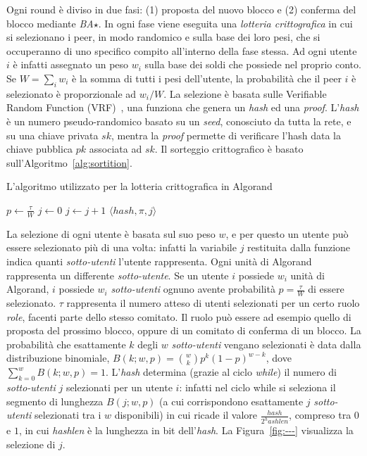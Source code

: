 Ogni round è diviso in due fasi: (1) proposta del nuovo blocco e (2) conferma del blocco mediante \emph{BA$\star$}.
In ogni fase viene eseguita una \emph{lotteria crittografica} in cui si selezionano i peer, in modo randomico e sulla base dei loro pesi, che si occuperanno di uno specifico compito all'interno della fase stessa. Ad ogni utente $i$ è infatti assegnato un peso $w_i$ sulla base dei soldi che possiede nel proprio conto. Se $W = \sum_i w_i$ è la somma di tutti i pesi dell'utente, la probabilità che il peer $i$ è selezionato è proporzionale ad $w_i/W$. La selezione è basata sulle Verifiable Random Function (VRF)~\cite{micali1999verifiable}, una funziona che genera un \emph{hash} ed una \emph{proof}. L'\emph{hash} è un numero pseudo-randomico basato su un \emph{seed}, conosciuto da tutta la rete, e su una chiave privata $sk$, mentra la \emph{proof} permette di verificare l'hash data la chiave pubblica $pk$ associata ad $sk$.
Il sorteggio crittografico è basato sull'Algoritmo~\ref{alg:sortition}.
\begin{algorithm}
	\caption{L'algoritmo utilizzato per la lotteria crittografica in Algorand}
	\begin{algorithmic}
			\State $p \leftarrow \frac{\tau}{W}$
			\State $j \leftarrow 0$
			\While{$\frac{hash}{2^{hashlen}} \notin [ \sum_{k = 0}^j B(k; w, p), \sum_{k=0}^{j+1} B(k; w, p) )$}
			\State $j \leftarrow j + 1$
			\EndWhile
			\Return $\langle hash, \pi, j \rangle$
		\EndProcedure
	\end{algorithmic}
	\label{alg:sortition}
\end{algorithm}
La selezione di ogni utente è basata sul suo peso $w$, e per questo un utente può essere selezionato più di una volta: infatti la variabile $j$ restituita dalla funzione indica quanti \emph{sotto-utenti} l'utente rappresenta. Ogni unità di Algorand rappresenta un differente \emph{sotto-utente}. Se un utente $i$ possiede $w_i$ unità di Algorand, $i$ possiede $w_i$ \emph{sotto-utenti} ognuno avente probabilità $p = \frac{\tau}{W}$ di essere selezionato. $\tau$ rappresenta il numero atteso di utenti selezionati per un certo ruolo \emph{role}, facenti parte dello stesso comitato. Il ruolo può essere ad esempio quello di proposta del prossimo blocco, oppure di un comitato di conferma di un blocco. La probabilità che esattamente $k$ degli $w$ \emph{sotto-utenti} vengano selezionati è data dalla distribuzione binomiale, $B(k; w, p) = \binom{w}{k} p^k (1-p)^{w-k}$, dove $\sum_{k=0}^w B(k; w, p) = 1$. L'\emph{hash} determina (grazie al ciclo \emph{while}) il numero di \emph{sotto-utenti} $j$ selezionati per un utente $i$: infatti nel ciclo while si seleziona il segmento di lunghezza $B(j; w, p)$ (a cui corrispondono esattamente $j$ \emph{sotto-utenti} selezionati tra i $w$ disponibili) in cui ricade il valore $\frac{hash}{2^hashlen}$, compreso tra $0$ e $1$, in cui \emph{hashlen} è la lunghezza in bit dell'\emph{hash}. La Figura~\ref{fig:---} visualizza la selezione di $j$. 
